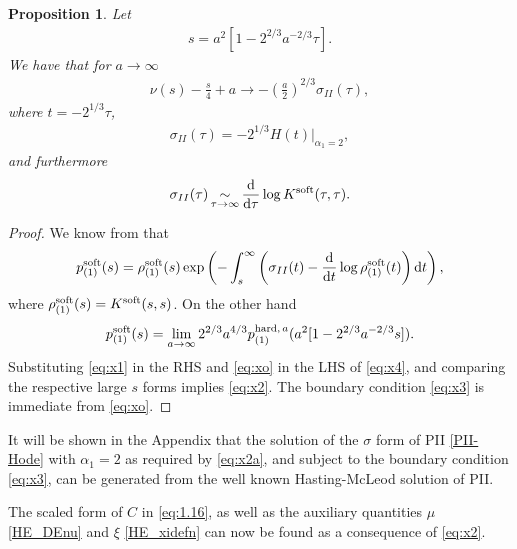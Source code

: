 \documentclass[10pt,reqno]{amsart}
\theoremstyle{plain}
\newtheorem{proposition}{Proposition}
\theoremstyle{definition}
\theoremstyle{remark}
\begin{document}
\begin{proposition} \label{prop:8new}
Let
\begin{align}
  s = a^2 [ 1-2^{2/3}a^{-2/3}\tau ].   
\label{H2S_s}
\end{align}
We have that for $a \rightarrow \infty$
\begin{align}
\nu(s) - \frac{s}{4} + a \rightarrow - \left( \frac{a}{2}\right) ^{2/3} \sigma_{II}(\tau),	 
\label{eq:x2} 
\end{align}
where $ t=-2^{1/3}\tau $,
\begin{align}
\sigma_{II}(\tau) = -2^{1/3} \left. H(t) \right|_{\alpha_1 = 2}	 ,
\label{eq:x2a}
\end{align}
and furthermore
\begin{align}
\sigma_{II}(\tau) \mathop{\sim}_{\tau \rightarrow \infty} \frac{{\rm d}}{{\rm d}\tau} \log K^{{\rm soft}}(\tau,\tau).	  
\label{eq:x3} 
\end{align} 
\end{proposition}

\begin{proof}
We know from \cite[Eq.~(8.84)]{rmt_Fo} that
\begin{align}
 p_{(1)}^{{\rm soft}}(s) = \rho_{(1)}^{{\rm soft}}(s)
	 \exp \left( - \int_s^{\infty} \left( \sigma_{II}(t) - \frac{\mbox{d}}{\mbox{d}t} \log \rho_{(1)}^{{\rm soft}}(t) \right) 
			{\mbox d}t \right) , 
\label{eq:xo}
\end{align}
where $\rho_{(1)}^{{\rm soft}}(s) = K^{{\rm soft}}(s,s)$. On the other hand 
\begin{align}
p_{(1)}^{{\rm soft}}(s) = \lim_{a \rightarrow \infty} 2^{2/3} a^{4/3}
        p_{(1)}^{{\rm hard,}\, a} ( a^2 [1-2^{2/3}a^{-2/3}s] ).
\label{eq:x4}
\end{align}
Substituting \eqref{eq:x1} in the RHS and \eqref{eq:xo} in  the LHS of \eqref{eq:x4}, and comparing the 
respective large $s$ forms implies \eqref{eq:x2}. The boundary condition \eqref{eq:x3} is immediate from
\eqref{eq:xo}.
\end{proof}

It will be shown in the Appendix that the solution of the $\sigma$ form of PII \eqref{PII-Hode} with
$\alpha_1 = 2$ as required by \eqref{eq:x2a}, and subject to the boundary condition \eqref{eq:x3}, can be
generated from the well known Hasting-McLeod solution of PII.

The scaled form of $C$ in \eqref{eq:1.16}, as well as the auxiliary quantities $\mu$ \eqref{HE_DEnu} 
and $\xi$ \eqref{HE_xidefn} can now be found as a consequence of \eqref{eq:x2}.
\end{document}
